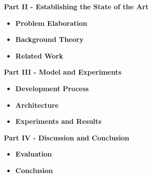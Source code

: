 \vspace{0.5cm}\noindent
\begin{minipage}{\linewidth}
    \textbf{Part II - Establishing the State of the Art}
    \begin{itemize}
        \item\textbf{Problem Elaboration} 
        \item\textbf{Background Theory} 
        \item\textbf{Related Work} 
    \end{itemize}
\end{minipage}

\vspace{0.5cm}\noindent
\begin{minipage}{\linewidth}
    \textbf{Part III - Model and Experiments}
    \begin{itemize}
        \item\textbf{Development Process} 
        \item\textbf{Architecture} 
        \item\textbf{Experiments and Results} 
    \end{itemize}
\end{minipage}

\vspace{0.5cm}\noindent
\begin{minipage}{\linewidth}
    \textbf{Part IV - Discussion and Conclusion}
    \begin{itemize}
        \item\textbf{Evaluation} 
        \item\textbf{Conclusion} 
    \end{itemize}
\end{minipage}